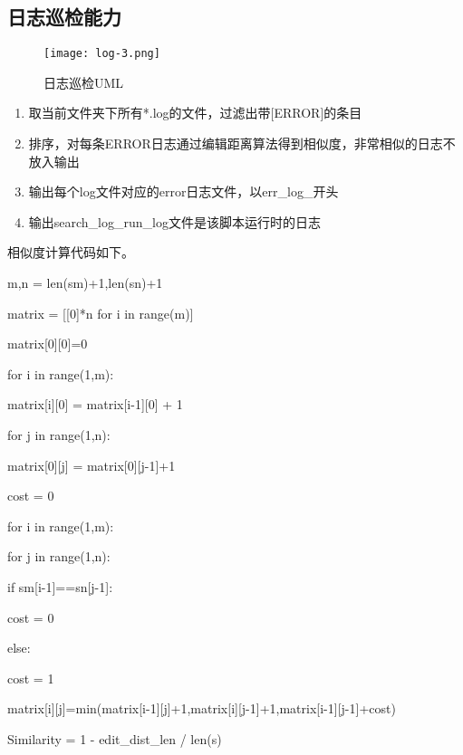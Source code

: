 \subsection{日志巡检能力}

\begin{figure}[H]
    \centering
    \texttt{[image: log-3.png]}
    \caption{日志巡检UML}
    \label{fig:日志巡检UML}
\end{figure}

\begin{enumerate}
    \item 取当前文件夹下所有*.log的文件，过滤出带[ERROR]的条目
    \item 排序，对每条ERROR日志通过编辑距离算法得到相似度，非常相似的日志不放入输出
    \item 输出每个log文件对应的error日志文件，以err\_log\_开头
    \item 输出search\_log\_run\_log文件是该脚本运行时的日志
\end{enumerate}

相似度计算代码如下。

\begin{algorithm}[H]
    \SetAlgoLined

    m,n = len(sm)+1,len(sn)+1

    matrix = [[0]*n for i in range(m)]

    matrix[0][0]=0

    for i in range(1,m):

    matrix[i][0] = matrix[i-1][0] + 1

    for j in range(1,n):

    matrix[0][j] = matrix[0][j-1]+1

    cost = 0

    for i in range(1,m):

    for j in range(1,n):

    if sm[i-1]==sn[j-1]:

    cost = 0

    else:

    cost = 1

    matrix[i][j]=min(matrix[i-1][j]+1,matrix[i][j-1]+1,matrix[i-1][j-1]+cost)

    Similarity = 1 - edit\_dist\_len / len(s)

\end{algorithm}

%


